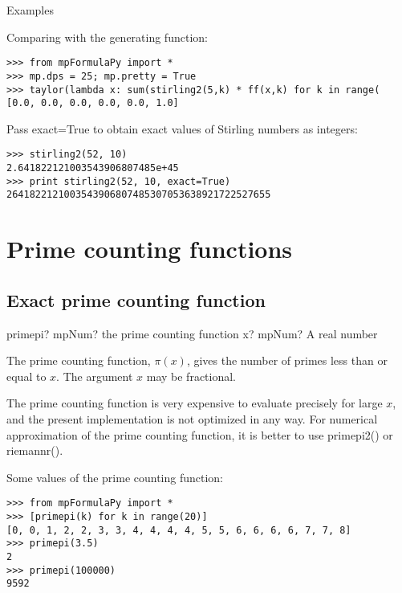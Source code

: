 Examples

Comparing with the generating function:

\begin{lstlisting}
>>> from mpFormulaPy import *
>>> mp.dps = 25; mp.pretty = True
>>> taylor(lambda x: sum(stirling2(5,k) * ff(x,k) for k in range(
[0.0, 0.0, 0.0, 0.0, 0.0, 1.0]
\end{lstlisting}

Pass exact=True to obtain exact values of Stirling numbers as integers:

\begin{lstlisting}
>>> stirling2(52, 10)
2.641822121003543906807485e+45
>>> print stirling2(52, 10, exact=True)
2641822121003543906807485307053638921722527655
\end{lstlisting}




\newpage
\section{Prime counting functions}

\subsection{Exact prime counting function}

\begin{mpFunctionsExtract}
	\mpFunctionOne
	{primepi? mpNum? the prime counting function}
	{x? mpNum? A real number}	
\end{mpFunctionsExtract}

\vpara
The prime counting function, $\pi(x)$, gives the number of primes less than or equal to $x$. The argument $x$ may be fractional.

The prime counting function is very expensive to evaluate precisely for large $x$, and the present implementation is not optimized in any way. For numerical approximation of the prime counting function, it is better to use primepi2() or riemannr().

Some values of the prime counting function:

\begin{lstlisting}
>>> from mpFormulaPy import *
>>> [primepi(k) for k in range(20)]
[0, 0, 1, 2, 2, 3, 3, 4, 4, 4, 4, 5, 5, 6, 6, 6, 6, 7, 7, 8]
>>> primepi(3.5)
2
>>> primepi(100000)
9592
\end{lstlisting}


